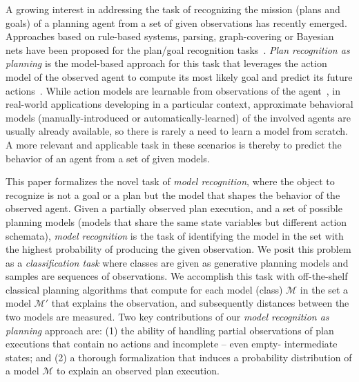 \documentclass[letterpaper]{article} %
\begin{document}
A growing interest in addressing the task of recognizing the mission (plans and goals) of a planning agent from a set of given observations has recently emerged. Approaches based on rule-based systems, parsing, graph-covering or Bayesian nets have been proposed for the plan/goal recognition tasks~\cite{sukthankar14}. {\em Plan recognition as planning} is the model-based approach for this task that leverages the action model of the observed agent to compute its most likely goal and predict its future actions~\cite{ramirez2009plan,ramirez2012plan}. While action models are learnable from observations of the agent~\cite{yang2007learning,cresswell2013acquiring,aineto2018learning}, in real-world applications developing in a particular context, approximate behavioral models (manually-introduced or 
automatically-learned) of the involved agents are usually already available, so there is rarely a need to learn a model from scratch. A more relevant and applicable task in these scenarios is thereby to predict the behavior of an agent from a set of given models.

This paper formalizes the novel task of {\em model recognition}, where the object to recognize is not a goal or a plan but the model that shapes the behavior of the observed agent. Given a partially observed plan execution, and a set of possible planning models (models that share the same state variables but different action schemata), {\em model recognition} is the task of identifying the model in the set with the highest probability of producing the given observation. We posit this problem as a \emph{classification task} where classes are given as generative planning models and samples are sequences of observations. We accomplish this task with off-the-shelf classical planning algorithms that compute for each model (class) $\mathcal{M}$ in the set a model $\mathcal{M'}$ that explains the observation, and subsequently distances between the two models are measured. Two key contributions of our {\em model recognition as planning} approach are: (1) the ability of handling partial observations of plan executions that contain no actions and incomplete -- even empty- intermediate states; and (2) a thorough formalization that induces a probability distribution of a model $\mathcal{M}$ to explain an observed plan execution.
\end{document}
